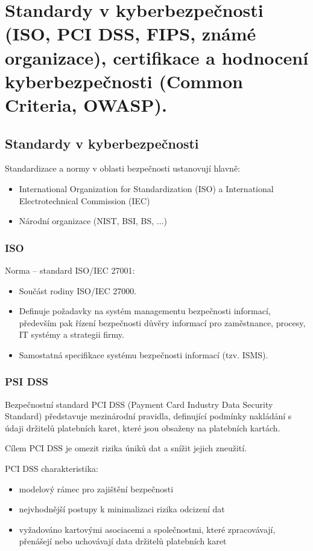 \clearpage
\section{Standardy v kyberbezpečnosti (ISO, PCI DSS, FIPS, známé organizace), certifikace a hodnocení kyberbezpečnosti (Common Criteria, OWASP).}

\subsection{Standardy v kyberbezpečnosti}
Standardizace a normy v oblasti bezpečnosti ustanovují hlavně:
\begin{itemize}
    \item International Organization for Standardization (ISO) a International Electrotechnical Commission (IEC)
    \item Národní organizace (NIST, BSI, BS, ...)
\end{itemize}

\subsubsection{ISO}
Norma – standard ISO/IEC 27001:
\begin{itemize}
    \item Součást rodiny ISO/IEC 27000.
    \item Definuje požadavky na systém managementu bezpečnosti informací, především pak řízení bezpečnosti důvěry informací pro zaměstnance, procesy, IT systémy a strategii firmy.
    \item Samostatná specifikace systému bezpečnosti informací (tzv. ISMS).
\end{itemize}

\subsubsection{PSI DSS}
Bezpečnostní standard PCI DSS (Payment Card Industry Data Security Standard) představuje mezinárodní pravidla, definující podmínky nakládání s údaji držitelů platebních karet, které jsou obsaženy na platebních kartách.

Cílem PCI DSS je omezit rizika úniků dat a snížit jejich zneužití.

PCI DSS charakteristika:
\begin{itemize}
    \item modelový rámec pro zajištění bezpečnosti
    \item nejvhodnější postupy k minimalizaci rizika odcizení dat
    \item vyžadováno kartovými asociacemi a společnostmi, které zpracovávají, přenášejí nebo uchovávají data držitelů platebních karet
\end{itemize} 

